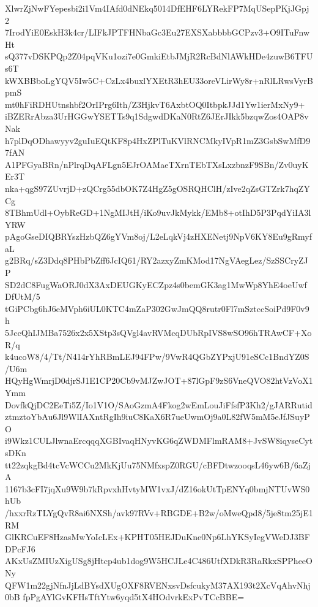 XlwrZjNwFYepesbi2i1Vm4IAfd0dNEkq5014DfEHF6LYRekFP7MqUSepPKjJGpj2
7IrodYiE0EskH3k4cr/LIFkJPTFHNbaGc3Eu27EXSXabbbbGCPzv3+O9ITuFnwHt
sQ377vDSKPQp2Z04pqVKu1ozi7e0GmkiEtbJMjR2RcBdNlAWkHDe4zuwB6TFUs6T
kWXBBboLgYQV5Iw5C+CzLx4buxlYXEtR3hEU33oreVLirWy8r+nRlLRwsVyrBpmS
mt0hFiRDHUtnshbf2OrIPrg6Ith/Z3HjkvT6AxbtOQ0ItbpkJJd1Yw1ierMxNy9+
iBZERrAbza3UrHGGwYSETTs9q1SdgwdDKaN0RtZ6JErJIkk5bzqwZos4OAP8vNak
h7plDqODhawyyv2guIuEQtKF8p4HxZPlTuKVlRNCMkyIVpR1mZ3GsbSwMfD97fAN
A1PFGyaBRn/nPlrqDqAFLgn5EJrOAMaeTXrnTEbTXsLxzbnzF9SBn/Zv0uyKEr3T
nka+qgS97ZUvrjD+zQCrg55dbOK7Z4HgZ5gOSRQHClH/zIve2qZsGTZrk7hqZYCg
8TBhmUdl+OybReGD+1NgMIJtH/iKo9uvJkMykk/EMb8+otIhD5P3PqdYiIA3lYRW
pAgoGseDIQBRYszHzbQZ6gYVm8oj/L2eLqkVj4zHXENetj9NpV6KY8Eu9gRmyfaL
g2BRq/sZ3Ddq8PHbPbZff6JcIQ61/RY2azxyZmKMod17NgVAegLez/SzSSCryZJP
SD2dC8FugWaORJ0dX3AxDEUGKyECZpz4s0bemGK3ag1MwWp8YhE4oeUwfDfUtM/5
tGiPCbg6hJ6eMVph6iUL0KTC4mZaP302GwJmQQ8rutr0Fl7mSztccSoiPd9F0v9h
5JccQhIJMBa7526x2x5XStp3sQVgl4avRVMcqDUbRpIVS8wSO96hTRAwCF+XoR/q
k4ucoW8/4/Tt/N414rYhRBmLEJ94FPw/9VwR4QGbZYPxjU91eSCc1BndYZ0S/U6m
HQyHgWmrjD0djrSJ1E1CP20Cb9vMJZwJOT+87lGpF9zS6VneQVO82htVzVoX1Ymm
DovfkQjDC2EeTi5Z/Io1V1O/SAoGzmA4Fkog2wEmLouJiFfsfP3Kh2/gJARRutid
ztmztoYbAu6Jl9WlIAXntRgIh9iuC8KaX6R7ueUwmOj9a0L82fW5mM5eJfJSuyPO
i9Wkz1CULJlwnaErcqqqXGBIvaqHNyvKG6qZWDMFlmRAM8+JvSW8iqyseCytsDKn
tt22zqkgBd4tcVcWCCu2MkKjUu75NMfxspZ0RGU/cBFDtwzooqsL46yw6B/6aZjA
1167b3cFI7jqXu9W9b7kRpvxhHvtyMW1vxJ/dZ16okUtTpENYq0bmjNTUvWS0hUb
/hxxrRzTLYgQvR8ai6NXSh/avk97RVv+RBGDE+B2w/oMweQpd8/5je8tm25jE1RM
GlKRCuEF8HzasMwYoIcLEx+KPHT05HEJDuKne0Np6LhYKSyIegVWeDJ3BFDPcFJ6
AKxUsZMIUzXigUSg8jHtcp4ub1dog9W5HCJLe4C486UtfXDkR3RaRkxSPPheeONy
QFW1m22gjNfnJjLdBYsdXUgOXF8RVENxsvDsfcukyM37AX193t2XcVqAhvNhj0bB
fpPgAYlGvKFHsTftYtw6yqd5tX4HOdvrkExPvTCcBBE=
